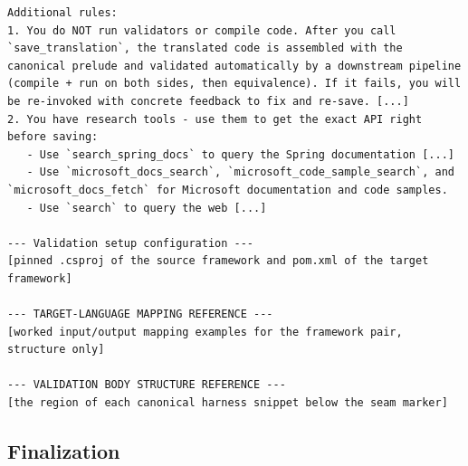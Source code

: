 \begin{longlisting}
\begin{verbatim}
Additional rules:
1. You do NOT run validators or compile code. After you call `save_translation`, the translated code is assembled with the canonical prelude and validated automatically by a downstream pipeline (compile + run on both sides, then equivalence). If it fails, you will be re-invoked with concrete feedback to fix and re-save. [...]
2. You have research tools - use them to get the exact API right before saving:
   - Use `search_spring_docs` to query the Spring documentation [...]
   - Use `microsoft_docs_search`, `microsoft_code_sample_search`, and `microsoft_docs_fetch` for Microsoft documentation and code samples.
   - Use `search` to query the web [...]

--- Validation setup configuration ---
[pinned .csproj of the source framework and pom.xml of the target framework]

--- TARGET-LANGUAGE MAPPING REFERENCE ---
[worked input/output mapping examples for the framework pair, structure only]

--- VALIDATION BODY STRUCTURE REFERENCE ---
[the region of each canonical harness snippet below the seam marker]
\end{verbatim}
\caption{Partial system prompt of the translation-generation stage.}
\label{lst:app-prompt-generation}
\end{longlisting}

\subsection*{Finalization}

